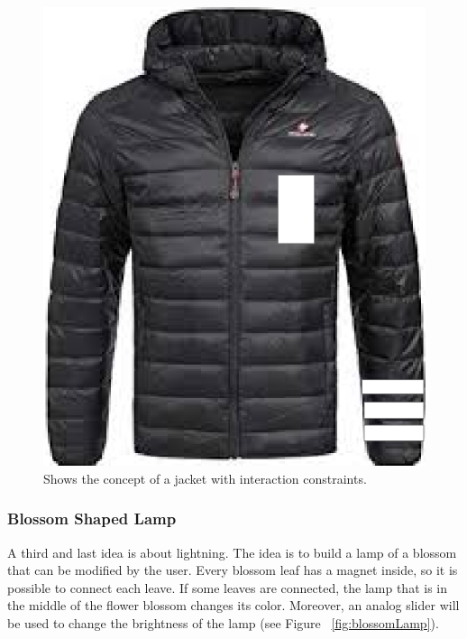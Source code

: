 \documentclass[04_projectProcess.tex]{subfiles}
\begin{document}
    \begin{figure}[h!]
        \centering
        \includegraphics[scale=0.2]{images/projectideas/jacket.png}
        \caption{Shows the concept of a jacket with interaction constraints.}
        \label{fig:jacketIdea}
    \end{figure}

    \subsubsection{Blossom Shaped Lamp}
    \label{BlossomShapedLamp}
    \begin{flushleft}
        A third and last idea is about lightning. The idea is to build a lamp of a blossom that can be 
        modified by the user. Every blossom leaf has a magnet inside, so it is possible to connect each 
        leave. If some leaves are connected, the lamp that is in the middle of the flower blossom changes 
        its color. Moreover, an analog slider will be used to change the brightness of the lamp (see 
        Figure ~\ref{fig:blossomLamp}).
    \end{flushleft}
\end{document}
